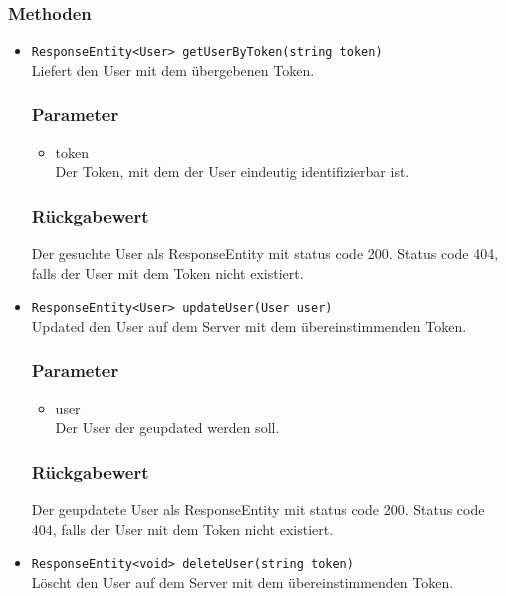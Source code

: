 \documentclass[a4paper]{scrreprt}
\begin{document}
\subsubsection*{Methoden}
\begin{addmargin}[25pt]{0pt}
\begin{itemize}

\item \texttt{ResponseEntity<User> getUserByToken(string token)}\\
	Liefert den User mit dem übergebenen Token. 

	\subsubsection*{Parameter}
	\begin{itemize}
	\item token \\
		Der Token, mit dem der User eindeutig identifizierbar ist.
	\end{itemize}

	\subsubsection*{Rückgabewert}
	Der gesuchte User als ResponseEntity mit status code 200.
	Status code 404, falls der User mit dem Token nicht existiert.

\item \texttt{ResponseEntity<User> updateUser(User user)}\\
	Updated den User auf dem Server mit dem übereinstimmenden Token.

	\subsubsection*{Parameter}
	\begin{itemize}
	\item user \\
		Der User der geupdated werden soll.
	\end{itemize}

	\subsubsection*{Rückgabewert}
	Der geupdatete User als ResponseEntity mit status code 200.
	Status code 404, falls der User mit dem Token nicht existiert.
	
\item \texttt{ResponseEntity<void> deleteUser(string token)}\\
	Löscht den User auf dem Server mit dem übereinstimmenden Token.


\end{itemize}
\end{addmargin}
\end{document}

